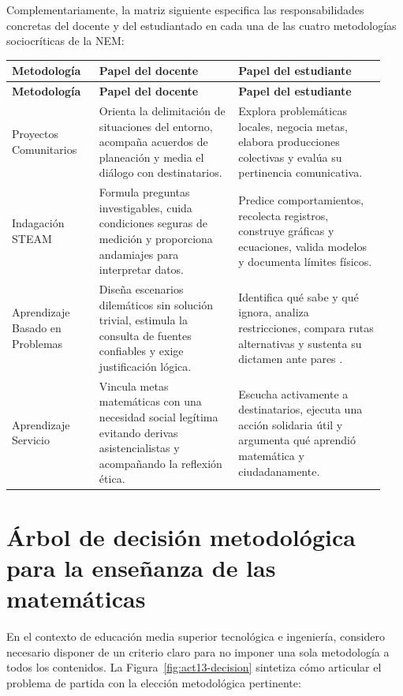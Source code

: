 \documentclass[spanish,letterpaper,oneside]{article}
\begin{document}
Complementariamente, la matriz siguiente especifica las responsabilidades concretas del docente y del estudiantado en cada una de las cuatro metodologías sociocríticas de la NEM:

{\small{}\renewcommand{\arraystretch}{1.3}}
{\small{}\renewcommand{\arraystretch}{1.3}
\begin{longtable}{|>{\raggedright\arraybackslash}p{0.22\linewidth}|>{\raggedright\arraybackslash}p{0.35\linewidth}|>{\raggedright\arraybackslash}p{0.37\linewidth}|}\hline
\rowcolor{iiiepePale} \textbf{Metodología} & \textbf{Papel del docente} & \textbf{Papel del estudiante} \\\hline
\endfirsthead
\hline
\rowcolor{iiiepePale} \textbf{Metodología} & \textbf{Papel del docente} & \textbf{Papel del estudiante} \\\hline
\endhead
Proyectos Comunitarios & Orienta la delimitación de situaciones del entorno, acompaña acuerdos de planeación y media el diálogo con destinatarios. & Explora problemáticas locales, negocia metas, elabora producciones colectivas y evalúa su pertinencia comunicativa. \\\hline
Indagación STEAM & Formula preguntas investigables, cuida condiciones seguras de medición y proporciona andamiajes para interpretar datos. & Predice comportamientos, recolecta registros, construye gráficas y ecuaciones, valida modelos y documenta límites físicos. \\\hline
Aprendizaje Basado en Problemas & Diseña escenarios dilemáticos sin solución trivial, estimula la consulta de fuentes confiables y exige justificación lógica. & Identifica qué sabe y qué ignora, analiza restricciones, compara rutas alternativas y sustenta su dictamen ante pares \citep{sawyer2008optimizing}. \\\hline
Aprendizaje Servicio & Vincula metas matemáticas con una necesidad social legítima evitando derivas asistencialistas y acompañando la reflexión ética. & Escucha activamente a destinatarios, ejecuta una acción solidaria útil y argumenta qué aprendió matemática y ciudadanamente. \\\hline
\end{longtable}}

\section{Árbol de decisión metodológica para la enseñanza de las matemáticas}
En el contexto de educación media superior tecnológica e ingeniería, considero necesario disponer de un criterio claro para no imponer una sola metodología a todos los contenidos. La Figura~\ref{fig:act13-decision} sintetiza cómo articular el problema de partida con la elección metodológica pertinente:
\end{document}
